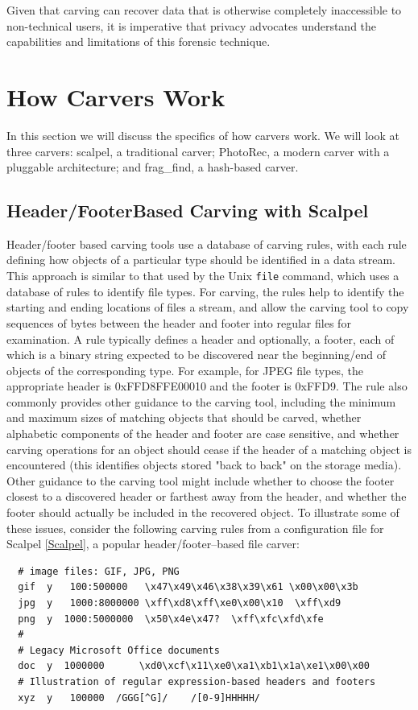 Given that carving can recover data that is otherwise completely inaccessible to non-technical users, it is imperative that privacy advocates understand the capabilities and limitations of this forensic technique.  


\section{How Carvers Work}
In this section we will discuss the specifics of how carvers work. We
will look at three carvers: scalpel, a traditional carver; PhotoRec, a
modern carver with a pluggable architecture; and frag\_find, a
hash-based carver.

\subsection{Header/Footer\-Based Carving with Scalpel}

Header/footer based carving tools use a database of carving rules,
with each rule defining how objects of a particular type should be
identified in a data stream. This approach is similar to that used by
the Unix {\tt file} command, which uses a database of rules to
identify file types.  For carving, the rules help to identify the
starting and ending locations of files a stream, and allow the carving
tool to copy sequences of bytes between the header and footer into
regular files for examination. A rule typically defines a header and
optionally, a footer, each of which is a binary string expected to be
discovered near the beginning/end of objects of the corresponding
type.  For example, for JPEG file types, the appropriate header is
0xFFD8FFE00010 and the footer is 0xFFD9.  The rule also commonly
provides other guidance to the carving tool, including the minimum and
maximum sizes of matching objects that should be carved, whether
alphabetic components of the header and footer are case sensitive, and
whether carving operations for an object should cease if the header of
a matching object is encountered (this identifies objects stored "back
to back" on the storage media).  Other guidance to the carving tool
might include whether to choose the footer closest to a discovered
header or farthest away from the header, and whether the footer should
actually be included in the recovered object.  To illustrate some of
these issues, consider the following carving rules from a
configuration file for Scalpel \ref{Scalpel}, a popular
header/footer--based file carver:

{
\begin{Verbatim}
  # image files: GIF, JPG, PNG
  gif  y   100:500000   \x47\x49\x46\x38\x39\x61 \x00\x00\x3b
  jpg  y   1000:8000000 \xff\xd8\xff\xe0\x00\x10  \xff\xd9
  png  y  1000:5000000  \x50\x4e\x47?  \xff\xfc\xfd\xfe
  #
  # Legacy Microsoft Office documents
  doc  y  1000000      \xd0\xcf\x11\xe0\xa1\xb1\x1a\xe1\x00\x00 
  # Illustration of regular expression-based headers and footers
  xyz  y   100000  /GGG[^G]/    /[0-9]HHHHH/
\end{Verbatim}
}

